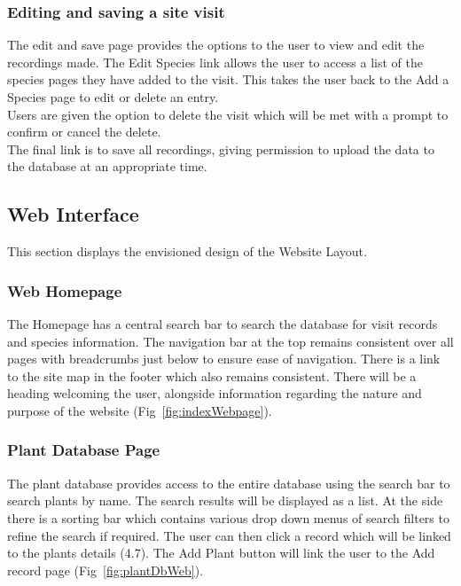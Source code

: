     \subsubsection{Editing and saving a site visit}
        The edit and save page provides the options to the user to view and edit the recordings made. The Edit Species link allows the user to access a list of the species pages they have added to the visit. This takes the user back to the Add a Species page to edit or delete an entry.\\
        
        Users are given the option to delete the visit which will be met with a prompt to confirm or cancel the delete.\\

        The final link is to save all recordings, giving permission to upload the data to the database at an appropriate time.\\
        
    \subsection{Web Interface}
        This section displays the envisioned design of the Website Layout.

        \subsubsection{Web Homepage}
            The Homepage has a central search bar to search the database for visit records and species information. The navigation bar at the top remains consistent over all pages with breadcrumbs just below to ensure ease of navigation. There is a link to the site map in the footer which also remains consistent. There will be a heading welcoming the user, alongside information regarding the nature and purpose of the website (Fig~\ref{fig:indexWebpage}).

        \subsubsection{Plant Database Page}
            The plant database provides access to the entire database using the search bar to search plants by name. The search results will be displayed as a list. At the side there is a sorting bar which contains various drop down menus of search filters to refine the search if required. The user can then click a record which will be linked to the plants details (4.7). The Add Plant button will link the user to the Add record page (Fig~\ref{fig:plantDbWeb}).

